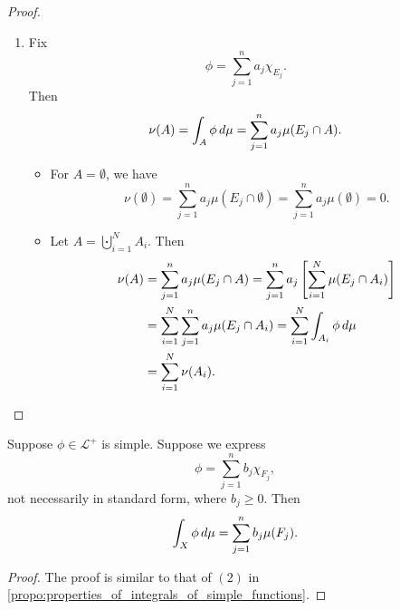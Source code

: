 \documentclass[notoc,notitlepage]{tufte-book}
\begin{document}
\begin{proof}
\begin{enumerate}
    \item Fix
      \begin{equation*}
        \phi = \sum_{j=1}^{n} a_j \chi_{E_j}.
      \end{equation*}
      Then
      \begin{equation*}
        \nu(A) = \int_{A} \phi \mathop{}\!d{\mu} = \sum_{j=1}^{n} a_j \mu(E_j \cap A).
      \end{equation*}
      \begin{itemize}
        \item For $A = \emptyset$, we have
          \begin{equation*}
            \nu(\emptyset)
            = \sum_{j=1}^{n} a_j \mu(E_j \cap \emptyset)
            = \sum_{j=1}^{n} a_j \mu(\emptyset)
            = 0.
          \end{equation*}
        \item Let $A = \bigcupdot_{i=1}^{N} A_i$. Then
          \begin{align*}
            \nu(A)
            &= \sum_{j=1}^{n} a_j \mu(E_j \cap A)
             = \sum_{j=1}^{n} a_j \left[ \sum_{i=1}^{N} \mu(E_j \cap A_i) \right] \\
            &= \sum_{i=1}^{N} \sum_{j=1}^{n} a_j \mu(E_j \cap A_i)
             = \sum_{i=1}^{N} \int_{A_i} \phi \mathop{}\!d{\mu} \\
            &= \sum_{i=1}^{N} \nu(A_i).
          \end{align*}
      \end{itemize}
  \end{enumerate}
\end{proof}

\begin{crly}\label{crly:integral_of_simple_functions_not_in_standard_form}
  Suppose $\phi \in \mathcal{L}^+$ is simple.
  Suppose we express
  \begin{equation*}
    \phi = \sum_{j=1}^{n} b_j \chi_{F_j},
  \end{equation*}
  not necessarily in standard form, where $b_j \geq 0$.
  Then
  \begin{equation*}
    \int_{X} \phi \mathop{}\!d{\mu} = \sum_{j=1}^{n} b_j \mu(F_j).
  \end{equation*}
\end{crly}

\begin{proof}
  The proof is similar to that of $(2)$ in
  \cref{propo:properties_of_integrals_of_simple_functions}.
\end{proof}
\end{document}
